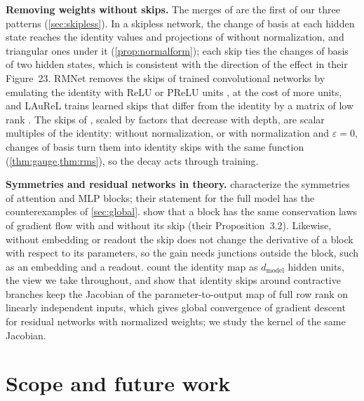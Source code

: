 \documentclass[10pt]{article}
\theoremstyle{definition}
\theoremstyle{remark}
\newcommand{\dm}{d_{\mathrm{model}}}
\newcommand{\para}[1]{\smallskip\noindent\textbf{#1}\hspace{0.5em}}
\begin{document}
\para{Removing weights without skips.} The merges of \citet{graef2024tricks} are the first of our three patterns (\cref{sec:skipless}). In a skipless network, the change of basis at each hidden state reaches the identity values and projections of \citet{he2024simplifying} without normalization, and triangular ones under it (\cref{prop:normalform}); each skip ties the changes of basis of two hidden states, which is consistent with the direction of the effect in their Figure~23. RMNet removes the skips of trained convolutional networks by emulating the identity with ReLU or PReLU units \citep{meng2021rmnet}, at the cost of more units, and LAuReL trains learned skips that differ from the identity by a matrix of low rank \citep{menghani2024laurel}. The skips of \citet{zhang2026residual}, scaled by factors that decrease with depth, are scalar multiples of the identity: without normalization, or with normalization and $\varepsilon = 0$, changes of basis turn them into identity skips with the same function (\cref{thm:gauge,thm:rms}), so the decay acts through training.

\para{Symmetries and residual networks in theory.} \citet{wang2025gauge} characterize the symmetries of attention and MLP blocks; their statement for the full model has the counterexamples of \cref{sec:global}. \citet{marcotte2025resnets} show that a block has the same conservation laws of gradient flow with and without its skip (their Proposition~3.2). Likewise, without embedding or readout the skip does not change the derivative of a block with respect to its parameters, so the gain needs junctions outside the block, such as an embedding and a readout. \citet{lin2018resnet} count the identity map as $\dm$ hidden units, the view we take throughout, and \citet{macdonald2023skip} show that identity skips around contractive branches keep the Jacobian of the parameter-to-output map of full row rank on linearly independent inputs, which gives global convergence of gradient descent for residual networks with normalized weights; we study the kernel of the same Jacobian.

\section{Scope and future work}\label{sec:outlook}
\end{document}
